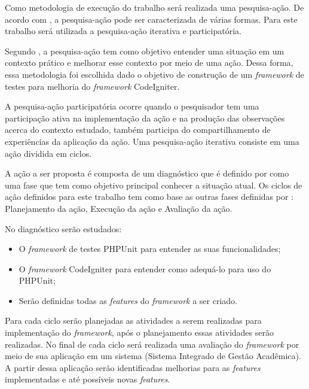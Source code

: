 Como metodologia de execução do trabalho será realizada uma pesquisa-ação. De acordo com , 
a pesquisa-ação pode ser caracterizada de várias formas. Para este trabalho será utilizada a pesquisa-ação iterativa e participatória.

Segundo , a pesquisa-ação tem como objetivo entender uma situação em um contexto prático e melhorar esse contexto por meio de uma ação.
Dessa forma, essa metodologia foi escolhida dado o objetivo de construção de um \textit{framework} de testes para melhoria do \textit{framework} CodeIgniter.

A pesquisa-ação participatória ocorre quando o pesquisador tem uma participação ativa na implementação da ação e na produção das observações acerca do contexto estudado, também participa do compartilhamento de experiências da aplicação da ação. Uma pesquisa-ação iterativa consiste em uma ação dividida em ciclos. \cite{artigo_pesquisa_acao}

A ação a ser proposta é composta de um diagnóstico que é definido por  como uma fase que tem como objetivo principal conhecer a situação atual. Os ciclos de ação definidos para este trabalho tem como base as outras fases definidas por : Planejamento da ação, Execução da ação e Avaliação da ação.

No diagnóstico serão estudados:
	\begin{itemize}
		\item O \textit{framework} de testes PHPUnit para entender as suas funcionalidades;
		\item O \textit{framework} CodeIgniter para entender como adequá-lo para uso do PHPUnit;
		\item Serão definidas todas as \textit{features} do \textit{framework} a ser criado.
	\end{itemize}

Para cada ciclo serão planejadas as atividades a serem realizadas para implementação do \textit{framework}, após o planejamento essas atividades
serão realizadas. No final de cada ciclo será realizada uma avaliação do \textit{framework} por meio de sua aplicação em um sistema (Sistema Integrado de Gestão Acadêmica). A partir dessa aplicação serão identificadas melhorias para as \textit{features} implementadas e até possíveis novas \textit{features}.

